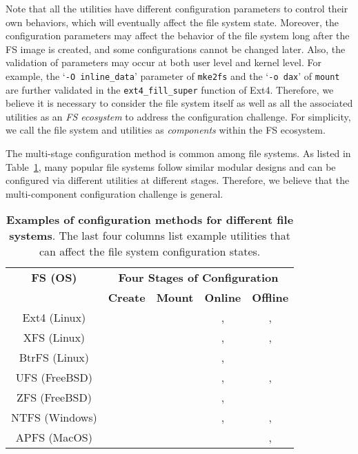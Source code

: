  Note that all the  utilities  have different configuration parameters to control their own behaviors, which will eventually affect the file system state. 
{Moreover, the configuration parameters may affect the behavior of the file system long after the FS image is created, and some configurations cannot be changed later. Also,}
  the validation of parameters may occur at both user level and kernel level.
 For example, the `\texttt{-O inline\_data}' parameter of \texttt{mke2fs} and the `\texttt{-o dax}' of \texttt{mount} are further validated in the \texttt{ext4\_fill\_super}  function of Ext4.
Therefore, we believe it is necessary to consider the file system itself as well as all the associated utilities as an \textit{FS ecosystem} to address the configuration challenge.
For simplicity, we call the  file system  and utilities as \textit{components} within the FS ecosystem.

The multi-stage configuration method  is common among   file systems. As listed in Table~\ref{tab:manyFSandUtilities}, many popular file systems follow  similar modular designs and can be configured via different utilities at different stages.
Therefore, we believe that the multi-component configuration challenge is general.

\begin{table}[t]
	\small
	\begin{center}
		\begin{tabular}{ c | c | c | c | c }
	\textbf{FS (OS)}  & \multicolumn{4}{c}{\textbf{Four  Stages of Configuration}}  \\
			\cline{2-5}
			\textbf{ } & \textbf{Create} & \textbf{Mount} &  \textbf{Online} & \textbf{Offline} \\ 
			\hline
			{Ext4 (Linux)} & \cite{mke2fs} & \cite{mount} & \cite{e4defrag}, \cite{resize2fs} & \cite{e2fsck}, \cite{resize2fs}  \\
			\hline
			{XFS (Linux)} & \cite{mkfsxfs} & \cite{mount} & \cite{xfsfsr}, \cite{xfsgrowfs} & \cite{xfsadmin}, \cite{xfsrepair}  \\
			\hline
			{BtrFS (Linux)} & \cite{mkfsbtrfs} & \cite{mount} & \cite{btrfsbalance}, \cite{btrfsscrub}  & \cite{btrfscheck} \\
			\hline
			{UFS (FreeBSD)} & \cite{newfs} & \cite{mountfreebsd} & \cite{growfs}, \cite{restore} & \cite{dump}, \cite{fsckufs}  \\
			\hline
			{ZFS (FreeBSD)} & \cite{zfs-create} & \cite{zfs-mount} & \cite{zfs-rollback}, \cite{zfsset} & \cite{zfs-destroy} \\
			\hline
			{NTFS (Windows)} & \cite{format} & \cite{mountvol} & \cite{chkdsk}, \cite{defrag}  & \cite{chkdsk}, \cite{shrink} \\
			\hline
			{APFS (MacOS)} & \cite{diskutil} & 
			\cite{mountapfs} &
			\cite{diskutil}  & \cite{diskutil}, \cite{fsckapfs} \\
			\hline
		\end{tabular}
	\end{center}
	\caption{ {\bf Examples of configuration methods for different file systems}. The last four columns  list example  utilities that can affect the file system configuration states.
	}
	\label{tab:manyFSandUtilities}
\end{table}

